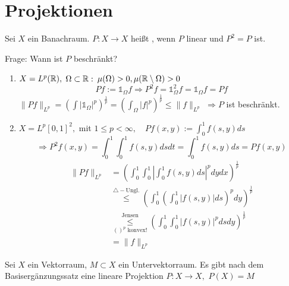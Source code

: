 
\section{Projektionen}



\begin{definition} \label{def:11.1-Projektion}
	Sei $X$ ein Banachraum. $P: X \rightarrow X$ hei{\ss}t , wenn $P$ linear und $P^{2} = P$ ist.
\end{definition}

Frage: Wann ist $P$ beschränkt?


\begin{beispiel}
	\begin{enumerate}[label=\alph*\upshape)]
		\item $X = L^{p}(\mathbb{R}), $ $\Omega \subset \mathbb{R}: $ $\mu(\Omega) > 0, \mu(\mathbb{R} \setminus \Omega) > 0$
			\[ P f := \mathds{1}_{\Omega} f \Rightarrow P^{2} f = \mathds{1}_{\Omega}^{2} f = \mathds{1}_{\Omega} f = P f \]
			$\| P f \|_{L^{p}} = \left( \int | \mathds{1}_{\Omega} |^{p} \right)^{\frac{1}{p}} = \left( \int_{\Omega} | f |^{p} \right)^{\frac{1}{p}} \leq \| f \|_{L^{p}}$ $\Rightarrow P$ ist beschränkt.
		\item $X = L^{p}[0, 1]^{2},$ mit $1 \leq p < \infty, \quad P f(x, y) := \int_{0}^{1} f(s, y) ds$
			\[ \Rightarrow P^{2} f (x, y) = \int_{0}^{1} \int_{0}^{1} f(s, y) ds dt = \int_{0}^{1} f(s, y) ds = P f(x, y) \]
			\begin{align*}
				\| P f \|_{L^{p}} & = \left( \int_{0}^{1} \int_{0}^{1} \left| \int_{0}^{1} f(s, y) ds \right|^{p} dy dx \right)^{\frac{1}{p}} \\
				& \overset{\triangle-\text{Ungl.}}{\leq} \left( \int_{0}^{1} \left( \int_{0}^{1} |f(s, y)| ds \right)^{p} dy \right)^{\frac{1}{p}} \\
				& \underset{()^{p} \text{ konvex!}}{\overset{\text{Jensen}}{\leq}}\left( \int_{0}^{1} \int_{0}^{1} |f(s, y)|^{p} ds dy \right)^{\frac{1}{p}} \\
				& = \| f \|_{L^{p}}
			\end{align*}
	\end{enumerate}
\end{beispiel}


\begin{bemerkung}
	Sei $X$ ein Vektorraum, $M \subset X$ ein Untervektorraum. Es gibt nach dem Basisergänzungssatz eine lineare Projektion $P: X \rightarrow X,$ $P(X) = M$	
\end{bemerkung}

